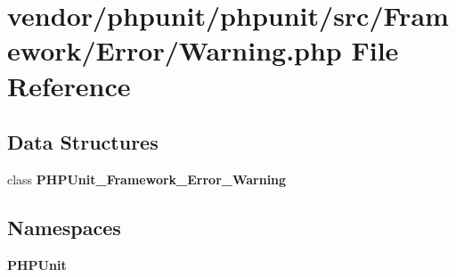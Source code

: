 \section{vendor/phpunit/phpunit/src/\+Framework/\+Error/\+Warning.php File Reference}
\label{_error_2_warning_8php}
\subsection*{Data Structures}
\begin{DoxyCompactItemize}
\item 
class {\bf P\+H\+P\+Unit\+\_\+\+Framework\+\_\+\+Error\+\_\+\+Warning}
\end{DoxyCompactItemize}
\subsection*{Namespaces}
\begin{DoxyCompactItemize}
\item 
 {\bf P\+H\+P\+Unit}
\end{DoxyCompactItemize}
